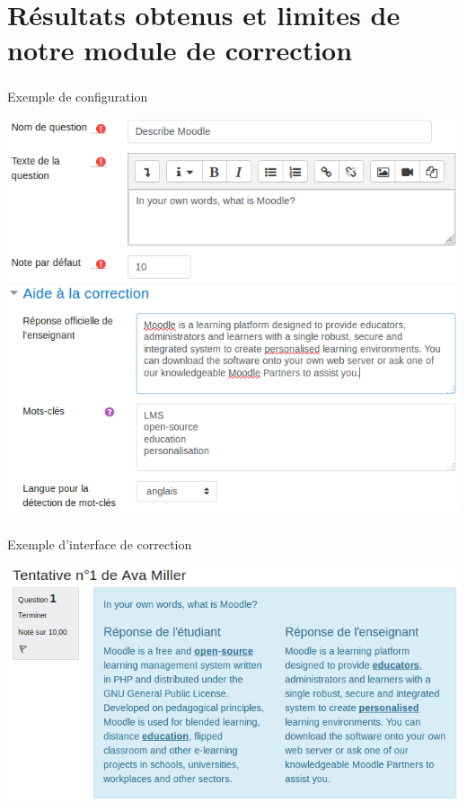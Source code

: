 \documentclass{beamer}
\begin{document}
  \section[R\'esultats]{R\'esultats obtenus et limites de notre module de correction}
  \begin{frame}
  \frametitle{\insertsection}
  \alert{Exemple de configuration}
  \vfill

    \hspace*{-0.9cm}\includegraphics[scale=0.4]{../images/questionform_base.png}
    \includegraphics[scale=0.4]{../images/questionform_helper.png}
  \end{frame}
  
  \begin{frame}
  \frametitle{\insertsection}
  \alert{Exemple d'interface de correction}\vfill
  \begin{center}
    \includegraphics[scale=0.6]{../images/questionform_correction.png}
  \end{center}
  \end{frame}
  
\end{document}
